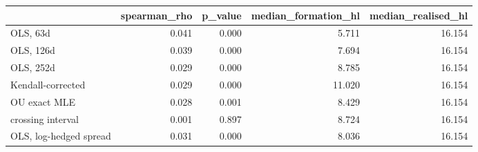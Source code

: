 \begin{tabular}{lrrrr}
\toprule
 & spearman_rho & p_value & median_formation_hl & median_realised_hl \\
\midrule
OLS, 63d & 0.041 & 0.000 & 5.711 & 16.154 \\
OLS, 126d & 0.039 & 0.000 & 7.694 & 16.154 \\
OLS, 252d & 0.029 & 0.000 & 8.785 & 16.154 \\
Kendall-corrected & 0.029 & 0.000 & 11.020 & 16.154 \\
OU exact MLE & 0.028 & 0.001 & 8.429 & 16.154 \\
crossing interval & 0.001 & 0.897 & 8.724 & 16.154 \\
OLS, log-hedged spread & 0.031 & 0.000 & 8.036 & 16.154 \\
\bottomrule
\end{tabular}
